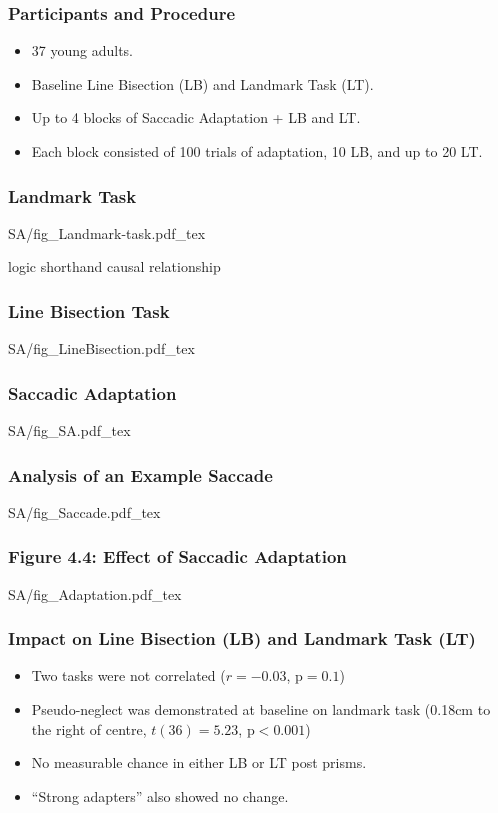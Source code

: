 \documentclass{beamer}
\begin{document}
\begin{frame}
	\frametitle{Participants and Procedure}
	\begin{itemize}
		\item 37 young adults.
		\item Baseline Line Bisection (LB) and Landmark Task (LT).
		\item Up to 4 blocks of Saccadic Adaptation + LB and LT.
		\item Each block consisted of 100 trials of adaptation, 10 LB, and up to 20 LT.
	\end{itemize}
\end{frame}



\begin{frame}
	\frametitle{Landmark Task}
	\def\svgwidth{0.8\textwidth}
	{SA/fig_Landmark-task.pdf_tex}
\end{frame}


\begin{frame}logic shorthand causal relationship
	\frametitle{Line Bisection Task}
	\def\svgwidth{0.9\textwidth}
	{SA/fig_LineBisection.pdf_tex}
\end{frame}

\begin{frame}
	\frametitle{Saccadic Adaptation}
	\centering
	\def\svgwidth{0.7\textwidth}
	\tiny
	{SA/fig_SA.pdf_tex}
\end{frame}


\begin{frame}
	\frametitle{Analysis of an Example Saccade}
	\centering
	\def\svgwidth{\textwidth}
	\tiny
	{SA/fig_Saccade.pdf_tex}
\end{frame}

\begin{frame}
	\frametitle{Figure 4.4: Effect of Saccadic Adaptation}
	\centering
	\def\svgwidth{0.9\textwidth}
	\tiny
	{SA/fig_Adaptation.pdf_tex}
\end{frame}

\begin{frame}
	\frametitle{Impact on Line Bisection (LB) and Landmark Task (LT)}
	\begin{itemize}
		\item Two tasks were not correlated ($r = -0.03$, $\text{p} = 0.1$)
		\item Pseudo-neglect was demonstrated at baseline on landmark task
		(0.18cm to the right of centre, $t(36) = 5.23$, $\text{p} < 0.001$)
		\item No measurable chance in either LB or LT post prisms.
		\item ``Strong adapters'' also showed no change.
	\end{itemize}

\end{frame}
\end{document}
